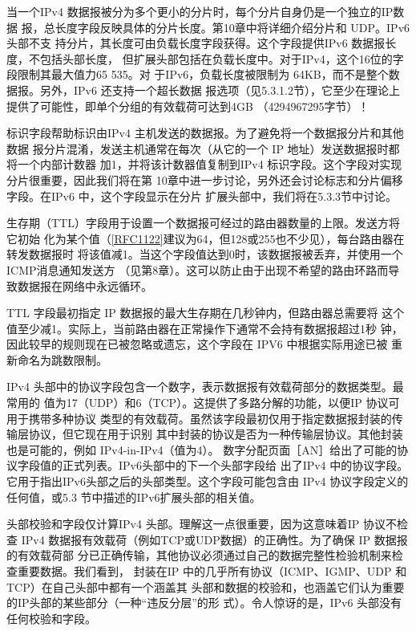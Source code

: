 当一个IPv4 数据报被分为多个更小的分片时，每个分片自身仍是一个独立的IP数据
报，总长度字段反映具体的分片长度。第10章中将详细介绍分片和 UDP。IPv6头部不支
持分片，其长度可由负载长度字段获得。这个字段提供IPv6 数据报长度，不包括头部长度，
但扩展头部包括在负载长度中。对于IPv4，这个16位的字段限制其最大值力65 535。对
于IPv6，负载长度被限制为 64KB，而不是整个数据报。另外，IPv6 还支持一个超长数据
报选项（见5.3.1.2节），它至少在理论上提供了可能性，即单个分组的有效载荷可达到4GB
（4294967295字节）！

标识字段帮助标识由IPv4 主机发送的数据报。为了避免将一个数据报分片和其他数据
报分片混淆，发送主机通常在每次（从它的一个 IP 地址）发送数据报时都将一个内部计数器
加1，并将该计数器值复制到IPv4 标识字段。这个字段对实现分片很重要，因此我们将在第
10章中进一步讨论，另外还会讨论标志和分片偏移字段。在IPv6 中，这个字段显示在分片
扩展头部中，我们将在5.3.3节中讨论。

生存期（TTL）字段用于设置一个数据报可经过的路由器数量的上限。发送方将它初始
化为某个值（\href{https://www.rfc-editor.org/rfc/rfc1122}{[RFC1122]}建议为64，但128或255也不少见），每台路由器在转发数据报时
将该值减1。当这个字段值达到0时，该数据报被丢弃，并使用一个ICMP消息通知发送方
（见第8章）。这可以防止由于出现不希望的路由环路而导致数据报在网络中永远循环。

\begin{tcolorbox}
    TTL 字段最初指定 IP 数据报的最大生存期在几秒钟内，但路由器总需要将
    这个值至少减1。实际上，当前路由器在正常操作下通常不会持有数据报超过1秒
    钟，因此较早的规则现在已被忽略或遗忘，这个字段在 IPV6 中根据实际用途已被
    重新命名为跳数限制。
\end{tcolorbox}

IPv4 头部中的协议字段包含一个数字，表示数据报有效载荷部分的数据类型。最常用的
值为17（UDP）和6（TCP）。这提供了多路分解的功能，以便IP 协议可用于携带多种协议
类型的有效载荷。虽然该字段最初仅用于指定数据报封装的传输层协议，但它现在用于识别
其中封装的协议是否为一种传输层协议。其他封装也是可能的，例如 IPv4-in-IPv4（值为4）。
数字分配页面［AN］给出了可能的协议字段值的正式列表。IPv6头部中的下一个头部字段给
出了IPv4 中的协议字段。它用于指出IPv6头部之后的头部类型。这个字段可能包含由 IPv4
协议字段定义的任何值，或5.3 节中描述的IPv6扩展头部的相关值。

头部校验和字段仅计算IPv4 头部。理解这一点很重要，因为这意味着IP 协议不检查
IPv4 数据报有效载荷（例如TCP或UDP数据）的正确性。为了确保 IP 数据报的有效载荷部
分已正确传输，其他协议必须通过自己的数据完整性检验机制来检查重要数据。我们看到，
封装在IP 中的几乎所有协议（ICMP、IGMP、UDP 和TCP）在自己头部中都有一个涵盖其
头部和数据的校验和，也涵盖它们认为重要的IP头部的某些部分（一种“违反分层”的形
式）。令人惊讶的是，IPv6 头部没有任何校验和字段。

